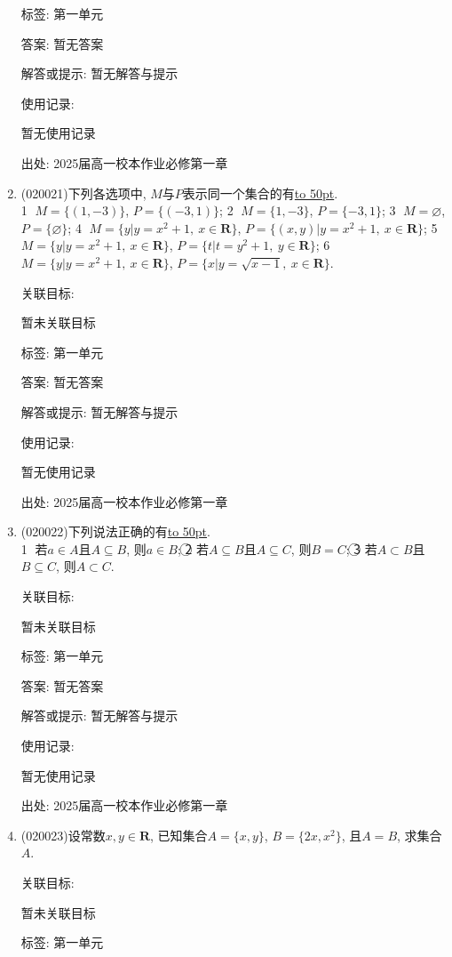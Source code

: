\documentclass[10pt,a4paper]{article}
\newcommand{\blank}[1]{\underline{\hbox to #1pt{}}}
\begin{document}
\begin{enumerate}[1.]
标签: 第一单元

答案: 暂无答案

解答或提示: 暂无解答与提示

使用记录:

暂无使用记录


出处: 2025届高一校本作业必修第一章
\item { (020021)}下列各选项中, $M$与$P$表示同一个集合的有\blank{50}.\\
\textcircled{1} $M=\{(1, -3)\}$, $P=\{(-3, 1)\}$; \textcircled{2} $M=\{1, -3\}$, $P=\{-3, 1\}$; \textcircled{3} $M=\varnothing$, $P=\{\varnothing\}$; \textcircled{4} $M=\{y|y=x^2+1, \  x\in\mathbf{R}\}$, $P=\{(x, y)|y=x^2+1, \ x\in\mathbf{R}\}$; \textcircled{5} $M=\{y|y=x^2+1, \  x\in\mathbf{R}\}$, $P=\{t|t=y^2+1, \ y\in\mathbf{R}\}$; \textcircled{6} $M=\{y|y=x^2+1, \  x\in\mathbf{R}\}$, $P=\{x|y=\sqrt{x-1},\  x\in\mathbf{R}\}$.


关联目标:

暂未关联目标



标签: 第一单元

答案: 暂无答案

解答或提示: 暂无解答与提示

使用记录:

暂无使用记录


出处: 2025届高一校本作业必修第一章
\item { (020022)}下列说法正确的有\blank{50}.\\
\textcircled{1} 若$a\in A$且$A\subseteq B$, 则$a\in B$; \textcircled{2} 若$A\subseteq B$且$A\subseteq C$, 则$B=C$; \textcircled{3} 若$A\subset B$且$B\subseteq C$, 则$A\subset C$.


关联目标:

暂未关联目标



标签: 第一单元

答案: 暂无答案

解答或提示: 暂无解答与提示

使用记录:

暂无使用记录


出处: 2025届高一校本作业必修第一章
\item { (020023)}设常数$x,y\in \mathbf{R}$, 已知集合$A=\{x, y\}$, $B=\{2x, x^2\}$, 且$A=B$, 求集合$A$.


关联目标:

暂未关联目标



标签: 第一单元


\end{enumerate}
\end{document}
